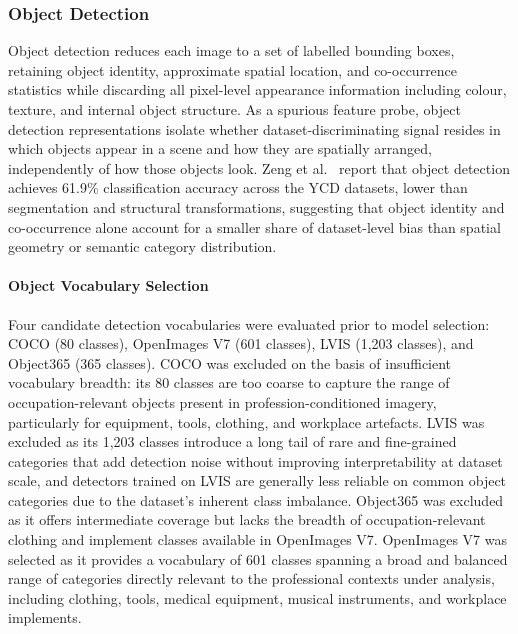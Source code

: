 \subsubsection{Object Detection}

Object detection reduces each image to a set of labelled bounding boxes, 
retaining object identity, approximate spatial location, and co-occurrence 
statistics while discarding all pixel-level appearance information including 
colour, texture, and internal object structure. As a spurious feature probe, 
object detection representations isolate whether dataset-discriminating signal 
resides in which objects appear in a scene and how they are spatially arranged, 
independently of how those objects look. Zeng et al.\ 
\cite{Zeng_2024_UnderstandingBiasinLargeScaleVisualDatasets} report that object 
detection achieves 61.9\% classification accuracy across the YCD datasets, lower 
than segmentation and structural transformations, suggesting that object identity 
and co-occurrence alone account for a smaller share of dataset-level bias than 
spatial geometry or semantic category distribution.

\paragraph{Object Vocabulary Selection}
Four candidate detection vocabularies were evaluated prior to model selection: 
COCO \cite{Lin_2014_COCO} (80 classes), OpenImages V7 
\cite{Kuznetsova_2020_OpenImagesV4} (601 classes), LVIS \cite{Gupta_2019_LVIS} 
(1{,}203 classes), and Object365 \cite{Shao_2019_Object365} (365 classes). COCO 
was excluded on the basis of insufficient vocabulary breadth: its 80 classes are 
too coarse to capture the range of occupation-relevant objects present in 
profession-conditioned imagery, particularly for equipment, tools, clothing, and 
workplace artefacts. LVIS was excluded as its 1{,}203 classes introduce a long 
tail of rare and fine-grained categories that add detection noise without 
improving interpretability at dataset scale, and detectors trained on LVIS are 
generally less reliable on common object categories due to the dataset's inherent 
class imbalance. Object365 was excluded as it offers intermediate coverage but 
lacks the breadth of occupation-relevant clothing and implement classes available 
in OpenImages V7. OpenImages V7 was selected as it provides a vocabulary of 601 
classes spanning a broad and balanced range of categories directly relevant to 
the professional contexts under analysis, including clothing, tools, medical 
equipment, musical instruments, and workplace implements.

